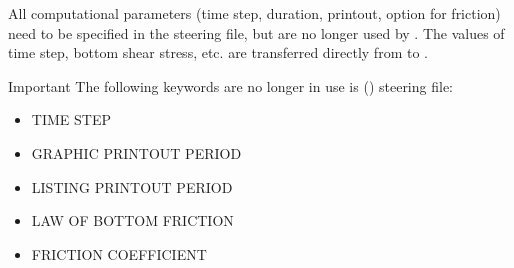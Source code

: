 \begin{itemize}
All computational parameters (time step, duration, printout, option for
friction) need to be specified in the \tel steering file, but are no
longer used by \sisyphe. The values of time step, bottom shear stress, etc. are
transferred directly from \tel to \sisyphe.
\begin{bclogo}[couleur = blue!10, arrondi = 0.10, logo = \bcattention]{\textsf{Important}}
The following keywords are no longer in use is (\sisyphe) steering file:
\begin{itemize}
\item {\ttfamily TIME STEP}
\item {\ttfamily GRAPHIC PRINTOUT PERIOD}
\item {\ttfamily LISTING PRINTOUT PERIOD}
\item {\ttfamily LAW OF BOTTOM FRICTION}
\item {\ttfamily FRICTION COEFFICIENT}
\end{itemize}
\end{bclogo}

\end{itemize}






